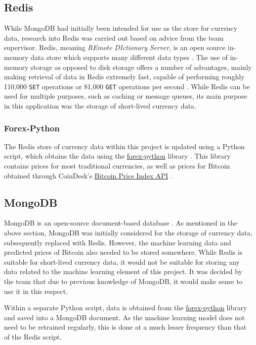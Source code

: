 \subsection{Redis}
While MongoDB had initially been intended for use as the store for currency data, research into Redis was carried out based on advice from the team supervisor. Redis, meaning \textit{REmote DIctionary Server}, is an open source in-memory data store which supports many different data types \cite{redishome}. The use of in-memory storage as opposed to disk storage offers a number of advantages, mainly making retrieval of data in Redis extremely fast, capable of performing roughly 110,000 \texttt{SET} operations or 81,000 \texttt{GET} operations per second \cite{redistut}. While Redis can be used for multiple purposes, such as caching or message queues, its main purpose in this application was the storage of short-lived currency data.

\subsubsection{Forex-Python}
The Redis store of currency data within this project is updated using a Python script, which obtains the data using the \textcolor{NavyBlue}{\href{https://pypi.python.org/pypi/forex-python}{forex-python}} library \cite{forexpy}. This library contains prices for most traditional currencies, as well as prices for Bitcoin obtained through CoinDesk's \textcolor{NavyBlue}{\href{https://www.coindesk.com/api/}{Bitcoin Price Index API}} \cite{bpiapi}.

\subsection{MongoDB}
MongoDB is an open-source document-based database \cite{mdbdocs}. As mentioned in the above section, MongoDB was initially considered for the storage of currency data, subsequently replaced with Redis. However, the machine learning data and predicted prices of Bitcoin also needed to be stored somewhere. While Redis is suitable for short-lived currency data, it would not be suitable for storing any data related to the machine learning element of this project. It was decided by the team that due to previous knowledge of MongoDB, it would make sense to use it in this respect.

Within a separate Python script, data is obtained from the \textcolor{NavyBlue}{\href{https://pypi.python.org/pypi/forex-python}{forex-python}} library and saved into a MongoDB document. As the machine learning model does not need to be retrained regularly, this is done at a much lesser frequency than that of the Redis script.

